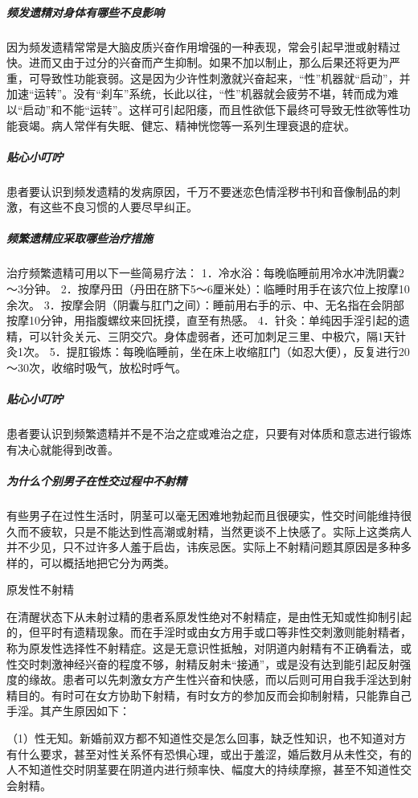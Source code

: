 \begin{enumerate}
\subparagraph{频发遗精对身体有哪些不良影响}

因为频发遗精常常是大脑皮质兴奋作用增强的一种表现，常会引起早泄或射精过快。进而又由于过分的兴奋而产生抑制。如果不加以制止，那么后果还将更为严重，可导致性功能衰弱。这是因为少许性刺激就兴奋起来，“性”机器就“启动”，并加速“运转”。没有“刹车”系统，长此以往，“性”机器就会疲劳不堪，转而成为难以“启动”和不能“运转”。这样可引起阳痿，而且性欲低下最终可导致无性欲等性功能衰竭。病人常伴有失眠、健忘、精神恍惚等一系列生理衰退的症状。

\subparagraph{贴心小叮咛}

患者要认识到频发遗精的发病原因，千万不要迷恋色情淫秽书刊和音像制品的刺激，有这些不良习惯的人要尽早纠正。

\subparagraph{频繁遗精应采取哪些治疗措施}

治疗频繁遗精可用以下一些简易疗法：
1．冷水浴：每晚临睡前用冷水冲洗阴囊2～3分钟。
2．按摩丹田（丹田在脐下5～6厘米处）：临睡时用手在该穴位上按摩10余次。
3．按摩会阴（阴囊与肛门之间）：睡前用右手的示、中、无名指在会阴部按摩10分钟，用指腹螺纹来回抚摸，直至有热感。
4．针灸：单纯因手淫引起的遗精，可以针灸关元、三阴交穴。身体虚弱者，还可加刺足三里、中极穴，隔1天针灸1次。
5．提肛锻炼：每晚临睡前，坐在床上收缩肛门（如忍大便），反复进行20～30次，收缩时吸气，放松时呼气。

\subparagraph{贴心小叮咛}

患者要认识到频繁遗精并不是不治之症或难治之症，只要有对体质和意志进行锻炼有决心就能得到改善。

\subparagraph{为什么个别男子在性交过程中不射精}

有些男子在过性生活时，阴茎可以毫无困难地勃起而且很硬实，性交时间能维持很久而不疲软，只是不能达到性高潮或射精，当然更谈不上快感了。实际上这类病人并不少见，只不过许多人羞于启齿，讳疾忌医。实际上不射精问题其原因是多种多样的，可以概括地把它分为两类。

原发性不射精

在清醒状态下从未射过精的患者系原发性绝对不射精症，是由性无知或性抑制引起的，但平时有遗精现象。而在手淫时或由女方用手或口等非性交刺激则能射精者，称为原发性选择性不射精症。这是无意识性抵触，对阴道内射精有不正确看法，或性交时刺激神经兴奋的程度不够，射精反射未“接通”，或是没有达到能引起反射强度的缘故。患者可以先刺激女方产生性兴奋和快感，而以后则可用自我手淫达到射精目的。有时可在女方协助下射精，有时女方的参加反而会抑制射精，只能靠自己手淫。其产生原因如下：

（1）性无知。新婚前双方都不知道性交是怎么回事，缺乏性知识，也不知道对方有什么要求，甚至对性关系怀有恐惧心理，或出于羞涩，婚后数月从未性交，有的人不知道性交时阴茎要在阴道内进行频率快、幅度大的持续摩擦，甚至不知道性交会射精。


\end{enumerate}
